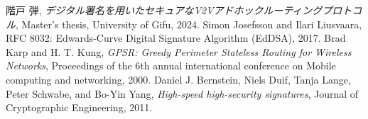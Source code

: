 \documentclass[a4j,9pt,twocolumn]{jsarticle}
\begin{document}
\noindent\hrulefill %
\begin{thebibliography}{99}
     階戸 弾,
        \textit{デジタル署名を用いたセキュアなV2Vアドホックルーティングプロトコル},
        Master's thesis, University of Gifu, 2024.
     Simon Josefsson and Ilari Liusvaara, 
        RFC 8032: Edwards-Curve Digital Signature Algorithm (EdDSA), 2017.
     Brad Karp and H. T. Kung, 
        \textit{GPSR: Greedy Perimeter Stateless Routing for Wireless Networks},
        Proceedings of the 6th annual international conference on Mobile computing and networking, 2000.
     Daniel J. Bernstein, Niels Duif, Tanja Lange, Peter Schwabe, and Bo-Yin Yang,
        \textit{High-speed high-security signatures}, Journal of Cryptographic Engineering, 2011.
\end{thebibliography}

\end{document}
